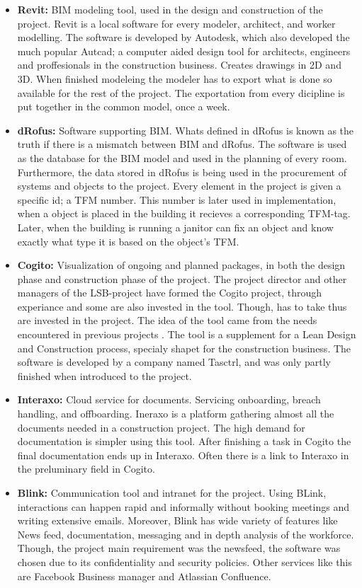 \begin{itemize}
    \item {\bf Revit:} BIM modeling tool, used in the design and construction of the project. Revit is a local software for every modeler, architect, and worker modelling. The software is developed by Autodesk, which also developed the much popular Autcad; a computer aided design tool for architects, engineers and proffesionals in the construction business. Creates drawings in 2D and 3D. When finished modeleing the modeler has to export what is done so available for the rest of the project. The exportation from every dicipline is put together in the common model, once a week.
    \item {\bf dRofus:} Software supporting BIM. Whats defined in dRofus is known as the truth if there is a mismatch between BIM and dRofus. The software is used as the database for the BIM model and used in the planning of every room. Furthermore, the data stored in dRofus is being used in the procurement of systems and objects to the project. Every element in the project is given a specific id; a TFM number. This number is later used in implementation, when a object is placed in the building it recieves a corresponding TFM-tag. Later, when the building is running a janitor can fix an object and know exactly what type it is based on the object's TFM.
    \item {\bf Cogito:} Visualization of ongoing and planned packages, in both the design phase and construction phase of the project. The project director and other managers of the LSB-project have formed the Cogito project, through experiance and some are also invested in the tool. Though, has to take thus are invested in the project. The idea of the tool came from the needs encountered in previous projects \cite{lean_i_praksis}. The tool is a supplement for a Lean Design and Construction process, specialy shapet for the construction business. The software is developed by a company named Tasctrl, and was only partly finished when introduced to the project. 
    \item {\bf Interaxo:} Cloud service for documents. Servicing onboarding, breach handling, and offboarding. Ineraxo is a platform gathering almost all the documents needed in a construction project. The high demand for documentation is simpler using this tool. After finishing a task in Cogito the final documentation ends up in Interaxo. Often there is a link to Interaxo in the preluminary field in Cogito.
    \item {\bf Blink:} Communication tool and intranet for the project. Using BLink, interactions can happen rapid and informally without booking meetings and writing extensive emails. Moreover, Blink has wide variety of features like News feed, documentation, messaging and in depth analysis of the workforce. Though, the project main requirement was the newsfeed, the software was chosen due to its confidentiality and security policies. Other services like this are Facebook Business manager and Atlassian Confluence. 

\end{itemize}
